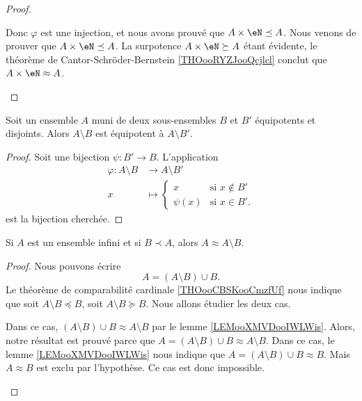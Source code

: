 \begin{proof}
\begin{subproof}
		Donc \( \varphi\) est une injection, et nous avons prouvé que \( A\times \eN\preceq A\).
		\spitem[La bijection]
		Nous venons de prouver que \( A\times \eN\preceq A\). La surpotence \( A\times \eN\succeq A\) étant évidente, le théorème de Cantor-Schröder-Bernstein \ref{THOooRYZJooQcjlcl} conclut que \( A\times \eN\approx A\).
	\end{subproof}
\end{proof}

\begin{lemma}        \label{LEMooDHWSooFqhano}
	Soit un ensemble \( A\) muni de deux sous-ensembles \( B\) et \( B'\) équipotents et disjoints. Alors \( A\setminus B\) est équipotent à \( A\setminus B'\).
\end{lemma}

\begin{proof}
	Soit une bijection \( \psi\colon B'\to B\). L'application
	\begin{equation}
		\begin{aligned}
			\varphi\colon A\setminus B & \to A\setminus B'                       \\
			x                          & \mapsto \begin{cases}
				                                     x       & \text{si } x\notin B' \\
				                                     \psi(x) & \text{si } x\in B'.
			                                     \end{cases}
		\end{aligned}
	\end{equation}
	est la bijection cherchée.
\end{proof}

\begin{lemma}       \label{LEMooIVCBooHWQiZB}
	Si \( A\) est un ensemble infini et si \( B\prec A\), alors \( A\approx A\setminus B\).
\end{lemma}

\begin{proof}
	Nous pouvons écrire
	\begin{equation}
		A=(A\setminus B)\cup B.
	\end{equation}
	Le théorème de comparabilité cardinale \ref{THOooCBSKooCmzfUf} nous indique que soit \( A\setminus B\preceq B\), soit \( A\setminus B\succeq B\). Nous allons étudier les deux cas.
	\begin{subproof}
		Dans ce cas, \( (A\setminus B)\cup B\approx A\setminus B\) par le lemme \ref{LEMooXMVDooIWLWis}. Alors, notre résultat est prouvé parce que \( A=(A\setminus B)\cup B\approx A\setminus B\).
		Dans ce cas, le lemme \ref{LEMooXMVDooIWLWis} nous indique que \( A=(A\setminus B)\cup B\approx B\). Mais \( A\approx B\) est exclu par l'hypothèse. Ce cas est donc impossible.
	\end{subproof}
\end{proof}

